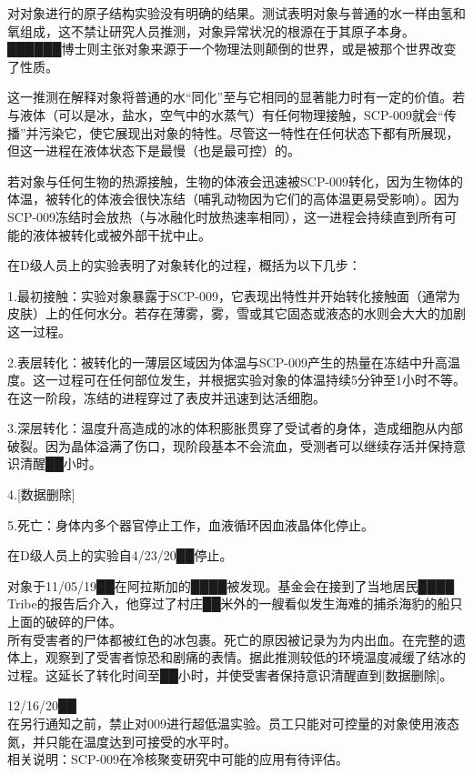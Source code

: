 对对象进行的原子结构实验没有明确的结果。测试表明对象与普通的水一样由氢和氧组成，这不禁让研究人员推测，对象异常状况的根源在于其原子本身。██████博士则主张对象来源于一个物理法则颠倒的世界，或是被那个世界改变了性质。

这一推测在解释对象将普通的水“同化”至与它相同的显著能力时有一定的价值。若与液体（可以是冰，盐水，空气中的水蒸气）有任何物理接触，SCP-009就会“传播”并污染它，使它展现出对象的特性。尽管这一特性在任何状态下都有所展现，但这一进程在液体状态下是最慢（也是最可控）的。

若对象与任何生物的热源接触，生物的体液会迅速被SCP-009转化，因为生物体的体温，被转化的体液会很快冻结（哺乳动物因为它们的高体温更易受影响）。因为SCP-009冻结时会放热（与冰融化时放热速率相同），这一进程会持续直到所有可能的液体被转化或被外部干扰中止。

在D级人员上的实验表明了对象转化的过程，概括为以下几步：

1.最初接触：实验对象暴露于SCP-009，它表现出特性并开始转化接触面（通常为皮肤）上的任何水分。若存在薄雾，雾，雪或其它固态或液态的水则会大大的加剧这一过程。

2.表层转化：被转化的一薄层区域因为体温与SCP-009产生的热量在冻结中升高温度。这一过程可在任何部位发生，并根据实验对象的体温持续5分钟至1小时不等。在这一阶段，冻结的进程穿过了表皮并迅速到达活细胞。

3.深层转化：温度升高造成的冰的体积膨胀贯穿了受试者的身体，造成细胞从内部破裂。因为晶体溢满了伤口，现阶段基本不会流血，受测者可以继续存活并保持意识清醒██小时。

4.[数据删除]

5.死亡：身体内多个器官停止工作，血液循环因血液晶体化停止。

在D级人员上的实验自4/23/20██停止。

对象于11/05/19██在阿拉斯加的████被发现。基金会在接到了当地居民████ Tribe的报告后介入，他穿过了村庄██米外的一艘看似发生海难的捕杀海豹的船只上面的破碎的尸体。\\
所有受害者的尸体都被红色的冰包裹。死亡的原因被记录为为内出血。在完整的遗体上，观察到了受害者惊恐和剧痛的表情。据此推测较低的环境温度减缓了结冰的过程。这延长了转化时间至██小时，并使受害者保持意识清醒直到[数据删除]。

12/16/20██\\
在另行通知之前，禁止对009进行超低温实验。员工只能对可控量的对象使用液态氮，并只能在温度达到可接受的水平时。\\
相关说明：SCP-009在冷核聚变研究中可能的应用有待评估。

